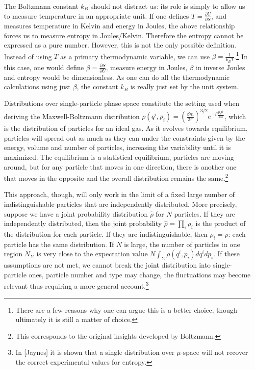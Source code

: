 \documentclass[prb, twocolumn]{revtex4-1}
\begin{document}
The Boltzmann constant $k_B$ should not distract us: its role is simply to allow us to measure temperature in an appropriate unit. If one defines $T = \frac{\partial U}{\partial S}$, and measures temperature in Kelvin and energy in Joules, the above relationship forces us to measure entropy in Joules/Kelvin. Therefore the entropy cannot be expressed as a pure number. However, this is not the only possible definition. Instead of using $T$ as a primary thermodynamic variable, we can use $\beta = \frac{1}{k_B T}$.\footnote{There are a few reasons why one can argue this is a better choice, though ultimately it is still a matter of choice.} In this case, one would define $\beta = \frac{\partial S}{\partial U}$, measure energy in Joules, $\beta$ in inverse Joules and entropy would be dimensionless. As one can do all the thermodynamic calculations using just $\beta$, the constant $k_B$ is really just set by the unit system.

Distributions over single-particle phase space constitute the setting used when deriving the Maxwell-Boltzmann distribution $\rho(q^i, p_i) = \left(\frac{\beta m}{2\pi} \right)^{3/2}e^{-\beta \frac{p_ip^i}{2m}}$, which is the distribution of particles for an ideal gas. As it evolves towards equilibrium, particles will spread out as much as they can under the constraints given by the energy, volume and number of particles, increasing the variability until it is maximized. The equilibrium is a statistical equilibrium, particles are moving around, but for any particle that moves in one direction, there is another one that moves in the opposite and the overall distribution remains the same.\footnote{This corresponds to the original insights developed by Boltzmann.}

This approach, though, will only work in the limit of a fixed large number of indistinguishable particles that are independently distributed. More precisely, suppose we have a joint probability distribution $\hat{\rho}$ for $N$ particles. If they are independently distributed, then the joint probability $\hat{\rho}=\prod_{i}\rho_i$ is the product of the distribution for each particle. If they are indistinguishable, then $\rho_i=\rho$: each particle has the same distribution. If $N$ is large, the number of particles in one region $N_\Sigma$ is very close to the expectation value $N\int_\Sigma \rho(q^i, p_i)dq^idp_i$. If these assumptions are not met, we cannot break the joint distribution into single-particle ones, particle number and type may change, the fluctuations may become relevant thus requiring a more general account.\footnote{In [Jaynes] it is shown that a single distribution over $\mu$-space will not recover the correct experimental values for entropy.}
\end{document}
